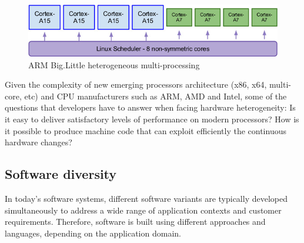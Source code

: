 \begin{figure}[h]
	\center
	\includegraphics[scale=0.7]{Background/fig/cortex.jpg}
	\caption{ARM Big.Little heterogeneous multi-processing}
	\label{fig:cortex}
\end{figure}


Given the complexity of new emerging processors architecture (x86, x64, multi-core, etc) and CPU manufacturers such as ARM, AMD and Intel, some of the questions that developers have to answer when facing hardware heterogeneity: 
Is it easy to deliver satisfactory levels of performance on modern processors? How is it possible to produce machine code that can exploit efficiently the continuous hardware changes? 











\subsection{Software diversity}
\label{sec:Software diversity}
In today's software systems, different software variants are typically developed simultaneously to address a wide range of application contexts and customer requirements\cite{schaefer2012software}. 
Therefore, software is built using different approaches and languages, depending on the application domain.

